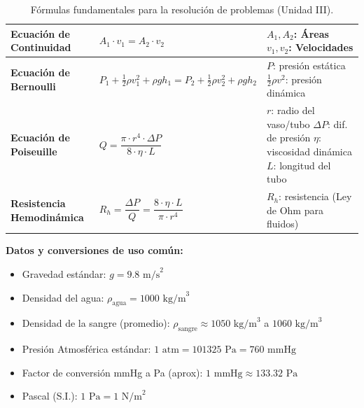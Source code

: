 \documentclass[12pt,letterpaper]{article}
\begin{document}
\begin{table}[h!]
\begin{tabular}{|>{\raggedright\arraybackslash}p{4cm}|>{\centering\arraybackslash}p{5.5cm}|>{\raggedright\arraybackslash}p{5cm}|}
        \hline
        \textbf{Ecuación de Continuidad} & $A_1 \cdot v_1 = A_2 \cdot v_2$ & $A_1, A_2$: Áreas \newline $v_1, v_2$: Velocidades \\
        \hline
        \textbf{Ecuación de Bernoulli} & $P_1 + \frac{1}{2}\rho v_1^2 + \rho g h_1 = P_2 + \frac{1}{2}\rho v_2^2 + \rho g h_2$ & $P$: presión estática \newline $\frac{1}{2}\rho v^2$: presión dinámica \\
        \hline
        \textbf{Ecuación de Poiseuille} & $Q = \dfrac{\pi \cdot r^4 \cdot \Delta P}{8 \cdot \eta \cdot L}$ & $r$: radio del vaso/tubo \newline $\Delta P$: dif. de presión \newline $\eta$: viscosidad dinámica \newline $L$: longitud del tubo \\
        \hline
        \textbf{Resistencia Hemodinámica} & $R_h = \dfrac{\Delta P}{Q} = \dfrac{8 \cdot \eta \cdot L}{\pi \cdot r^4}$ & $R_h$: resistencia \newline (Ley de Ohm para fluidos) \\
        \hline
    \end{tabular}
    \vspace{0.3cm}
    \caption{Fórmulas fundamentales para la resolución de problemas (Unidad III).}
    \label{tab:formulas_u3}
\end{table}

\vspace{0.5cm}
\noindent \textbf{Datos y conversiones de uso común:}
\begin{itemize}
    \item Gravedad estándar: $g = 9.8 \text{ m/s}^2$
    \item Densidad del agua: $\rho_{\text{agua}} = 1000 \text{ kg/m}^3$
    \item Densidad de la sangre (promedio): $\rho_{\text{sangre}} \approx 1050 \text{ kg/m}^3$ a $1060 \text{ kg/m}^3$
    \item Presión Atmosférica estándar: $1 \text{ atm} = 101325 \text{ Pa} = 760 \text{ mmHg}$
    \item Factor de conversión mmHg a Pa (aprox): $1 \text{ mmHg} \approx 133.32 \text{ Pa}$
    \item Pascal (S.I.): $1 \text{ Pa} = 1 \text{ N/m}^2$
\end{itemize}
\end{document}
